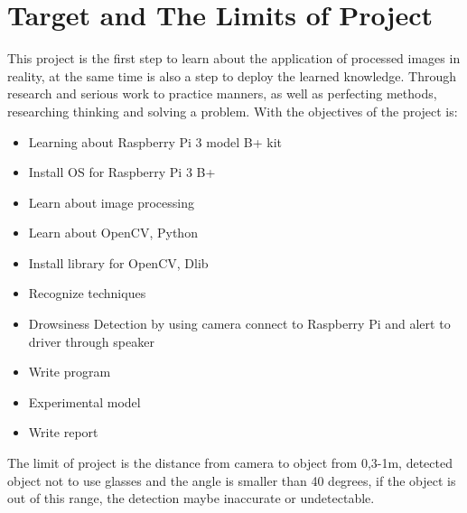 \section{Target and The Limits of Project}
    This project is the first step to learn about the application of processed images in reality, at the same time is also 
    a step to deploy the learned knowledge. Through research and serious work to practice manners, as well as perfecting 
    methods, researching thinking and solving a problem. With the objectives of the project is:
    \begin{itemize}
        \item Learning about Raspberry Pi 3 model B+ kit
        \item Install OS for Raspberry Pi 3 B+
        \item Learn about image processing
        \item Learn about OpenCV, Python
        \item Install library for OpenCV, Dlib
        \item Recognize techniques
        \item Drowsiness Detection by using camera connect to Raspberry Pi and alert to driver through speaker
        \item Write program
        \item Experimental model
        \item Write report
    \end{itemize}
    The limit of project is the distance from camera to object from 0,3-1m, detected object not to use glasses and 
    the angle is smaller than 40 degrees, if the object is out of this range, the detection maybe inaccurate or undetectable.